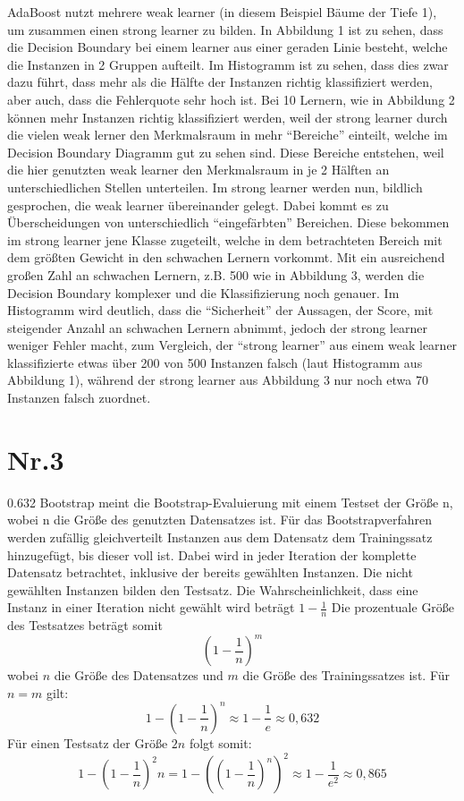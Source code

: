 \documentclass[a4paper,11pt,twoside]{article}
\begin{document}
AdaBoost nutzt mehrere weak learner (in diesem Beispiel Bäume der Tiefe 1), um zusammen einen strong learner zu bilden. In Abbildung 1 ist zu sehen, dass die Decision Boundary bei einem learner aus einer geraden Linie besteht, welche die Instanzen in 2 Gruppen aufteilt. Im Histogramm ist zu sehen, dass dies zwar dazu führt, dass mehr als die Hälfte der Instanzen richtig klassifiziert werden, aber auch, dass die Fehlerquote sehr hoch ist. Bei 10 Lernern, wie in Abbildung 2 können mehr Instanzen richtig klassifiziert werden, weil der strong learner durch die vielen weak lerner den Merkmalsraum in mehr "`Bereiche"' einteilt, welche im Decision Boundary Diagramm gut zu sehen sind. Diese Bereiche entstehen, weil die hier genutzten weak learner den Merkmalsraum in je 2 Hälften an unterschiedlichen Stellen unterteilen. Im strong learner werden nun, bildlich gesprochen, die weak learner übereinander gelegt. Dabei kommt es zu Überscheidungen von unterschiedlich "`eingefärbten"' Bereichen. Diese bekommen im strong learner jene Klasse zugeteilt, welche in dem betrachteten Bereich mit dem größten Gewicht in den schwachen Lernern vorkommt. Mit ein ausreichend großen Zahl an schwachen Lernern, z.B. 500 wie in Abbildung 3, werden die Decision Boundary komplexer und die Klassifizierung noch genauer. Im Histogramm wird deutlich, dass die "`Sicherheit"' der Aussagen, der Score, mit steigender Anzahl an schwachen Lernern abnimmt, jedoch der strong learner weniger Fehler macht, zum Vergleich, der "`strong learner"' aus einem weak learner klassifizierte etwas über 200 von 500 Instanzen falsch (laut Histogramm aus Abbildung 1), während der strong learner aus Abbildung 3 nur noch etwa 70 Instanzen falsch zuordnet.

\section*{Nr.3}
0.632 Bootstrap meint die Bootstrap-Evaluierung mit einem Testset der Größe n, wobei n die Größe des genutzten Datensatzes ist. Für das Bootstrapverfahren werden zufällig gleichverteilt Instanzen aus dem Datensatz dem Trainingssatz hinzugefügt, bis dieser voll ist. Dabei wird in jeder Iteration der komplette Datensatz betrachtet, inklusive der bereits gewählten Instanzen. Die nicht gewählten Instanzen bilden den Testsatz.
Die Wahrscheinlichkeit, dass eine Instanz in einer Iteration nicht gewählt wird beträgt
$ 1 - \frac{1}{n}$
Die prozentuale Größe des Testsatzes beträgt somit
\[ (1 - \frac{1}{n})^m \]
wobei $n$ die Größe des Datensatzes und $m$ die Größe des Trainingssatzes ist. Für $n = m$ gilt:
\[ 1 - (1 - \frac{1}{n})^n \approx 1 - \frac{1}{e} \approx 0,632 \]
Für einen Testsatz der Größe $2n$  folgt somit:
\[ 1 - (1 - \frac{1}{n})^2n = 1 - \left((1 - \frac{1}{n})^n\right)^2  \approx 1 - \frac{1}{e^2} \approx 0,865 \]
\end{document}
